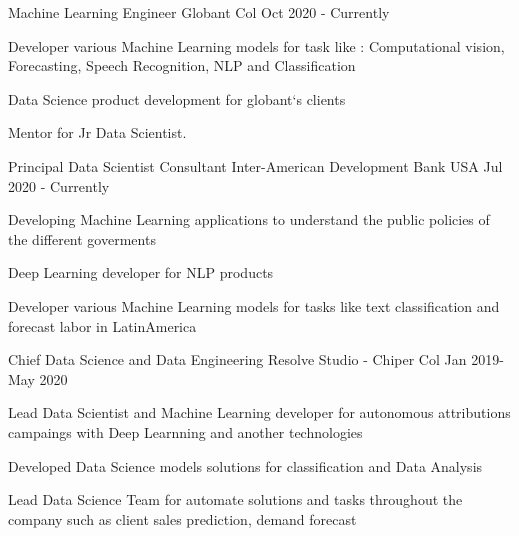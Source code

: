 

\begin{cventries}

\cventry
    {Machine Learning Engineer} %
    {Globant} %
    {Col} %
    {Oct 2020 - Currently} %
    {
      \begin{cvitems} %
        \item {Developer various Machine Learning models for task like : Computational vision, Forecasting, Speech Recognition, NLP and Classification}
        \item {Data Science product development for globant`s clients }
        \item {Mentor for Jr Data Scientist.}
      \end{cvitems}
    }



\cventry
    {Principal Data Scientist Consultant} %
    {Inter-American Development Bank} %
    {USA} %
    {Jul 2020 - Currently} %
    {
      \begin{cvitems} %
        \item {Developing Machine Learning applications to understand the public policies of the different goverments}
        \item {Deep Learning developer for NLP products}
        \item {Developer various Machine Learning models for tasks like text classification and forecast labor in LatinAmerica}
      \end{cvitems}
    }



  

  \cventry
    {Chief Data Science and Data Engineering } %
    {Resolve Studio - Chiper} %
    {Col} %
    {Jan 2019- May 2020} %
    {
      \begin{cvitems} %
        \item {Lead Data Scientist and Machine Learning developer for autonomous attributions campaings with Deep Learnning and another technologies}
        \item {Developed  Data Science models solutions  for classification and Data Analysis}
        \item{Lead Data Science Team  for automate solutions and tasks throughout the company such as client sales prediction, demand forecast}
      \end{cvitems}
    }


\end{cventries}
